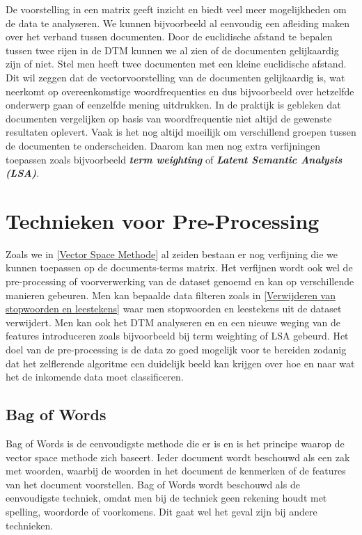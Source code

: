 %
De voorstelling in een matrix geeft inzicht en biedt veel meer mogelijkheden om de data te analyseren. We kunnen bijvoorbeeld al eenvoudig een afleiding maken over het verband tussen documenten.
Door de euclidische afstand te bepalen tussen twee rijen in de DTM kunnen we al zien of de documenten gelijkaardig zijn of niet. Stel men heeft twee documenten met een kleine euclidische afstand. Dit wil zeggen dat de vectorvoorstelling van de documenten gelijkaardig is, wat neerkomt op overeenkomstige woordfrequenties en dus bijvoorbeeld over hetzelfde onderwerp gaan of eenzelfde mening uitdrukken.
%
In de praktijk is gebleken dat documenten vergelijken op basis van woordfrequentie niet altijd de gewenste resultaten oplevert. Vaak is het nog altijd moeilijk om verschillend groepen tussen de documenten te onderscheiden. Daarom kan men nog extra verfijningen toepassen zoals bijvoorbeeld \textbf{\textit{term weighting}} of \textbf{\textit{Latent Semantic Analysis (LSA)}}.


\section{Technieken voor Pre-Processing}\label{Technieken voor Pre-Processing}

Zoals we in \ref{Vector Space Methode}  al zeiden bestaan er nog verfijning die we kunnen toepassen op de documents-terms matrix. Het verfijnen wordt ook wel de pre-processing of voorverwerking van de dataset genoemd en kan op verschillende manieren gebeuren. Men kan bepaalde data filteren zoals in \ref{Verwijderen van stopwoorden en leestekens} waar men stopwoorden en leestekens uit de dataset verwijdert. Men kan ook het DTM analyseren en en een nieuwe weging van de features introduceren zoals bijvoorbeeld bij term weighting of LSA gebeurd. Het doel van de pre-processing is de data zo goed mogelijk voor te bereiden zodanig dat het zelflerende algoritme een duidelijk beeld kan krijgen over hoe en naar wat het de inkomende data moet classificeren.

\subsection{Bag of Words}\label{Bag of Words}

Bag of Words is de eenvoudigste methode die er is en is het principe waarop de vector space methode zich baseert. Ieder document wordt beschouwd als een zak met woorden, waarbij de woorden in het document de kenmerken of de features van het document voorstellen. Bag of Words wordt beschouwd als de eenvoudigste techniek, omdat men bij de techniek geen rekening houdt met spelling, woordorde of voorkomens. Dit gaat wel het geval zijn bij andere technieken.

